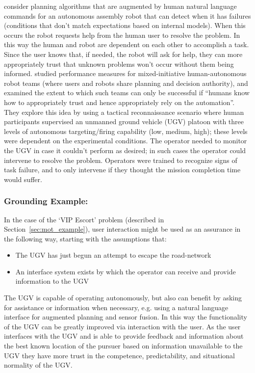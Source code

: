 \citet{Tellex2014-uc} consider planning algorithms that are augmented by human natural language commands for an autonomous assembly robot that can detect when it has failures (conditions that don't match expectations based on internal models). When this occurs the robot requests help from the human user to resolve the problem. In this way the human and robot are dependent on each other to accomplish a task. Since the user knows that, if needed, the robot will ask for help, they can more appropriately trust that unknown problems won't occur without them being informed.
%
\citet{Freedy2007-sg} studied performance measures for  mixed-initiative human-autonomous robot teams (where users and robots share planning and decision authority), and examined the extent to which such teams can only be successful if ``humans know how to appropriately trust and hence appropriately rely on the automation''. They explore this idea by using a tactical reconnaissance scenario where human participants supervised an unmanned ground vehicle (UGV)  platoon with three levels of autonomous targeting/firing capability (low, medium, high); these levels were dependent on the experimental conditions. The operator needed to monitor the UGV in case it couldn't perform as desired; in such cases the operator could intervene to resolve the problem. Operators were trained to recognize signs of task failure, and to only intervene if they thought the mission completion time would suffer. 

\subsubsection{Grounding Example:}
In the case of the `VIP Escort' problem (described in Section~\ref{sec:mot_example}), user interaction might be used as an assurance in the following way, starting with the assumptions that:

\begin{itemize}
    \item The UGV has just begun an attempt to escape the road-network
    \item An interface system exists by which the operator can receive and provide information to the UGV
\end{itemize}

The UGV is capable of operating autonomously, but also can benefit by asking for assistance or information when necessary, e.g. using a natural language interface for augmented planning and sensor fusion. In this way the functionality of the UGV can be greatly improved via interaction with the user. As the user interfaces with the UGV and is able to provide feedback and information about the best known location of the pursuer based on information unavailable to the UGV they have more trust in the competence, predictability, and situational normality of the UGV.

